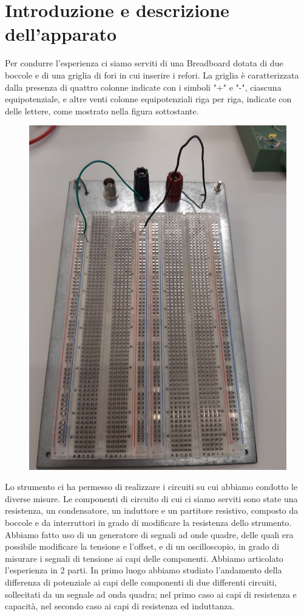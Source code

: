 \section{Introduzione e descrizione dell'apparato}
Per condurre l'esperienza ci siamo serviti di una Breadboard dotata di due boccole e di una griglia di fori in cui inserire i refori. La griglia è caratterizzata dalla presenza di quattro colonne indicate con i simboli "+" e "-", ciascuna equipotenziale, e altre venti colonne equipotenziali riga per riga, indicate con delle lettere, come mostrato nella figura sottostante.

\begin{figure}[h!]
    \centering
    \includegraphics[scale=0.1]{Immagini/Circuitoooo.jpeg}
    \caption{}
\end{figure}

Lo strumento ci ha permesso di realizzare i circuiti su cui abbiamo condotto le diverse misure. Le componenti di circuito di cui ci siamo serviti sono state una resistenza, un condensatore, un induttore e un partitore resistivo, composto da boccole e da interruttori in grado di modificare la resistenza dello strumento.
Abbiamo fatto uso di un generatore di segnali ad onde quadre, delle quali era possibile modificare la tensione e l'offset, e di un oscilloscopio, in grado di misurare i segnali di tensione ai capi delle componenti.
Abbiamo articolato l'esperienza in 2 parti.
In primo luogo abbiamo studiato l'andamento della differenza di potenziale ai capi delle componenti di due differenti circuiti, sollecitati da un segnale ad onda quadra; nel primo caso ai capi di resistenza e capacità, nel secondo caso ai capi di resistenza ed induttanza.

